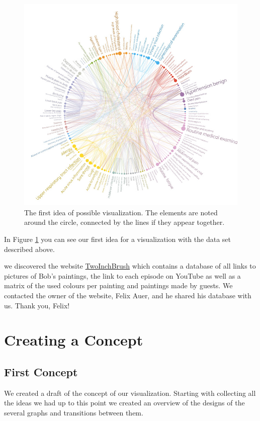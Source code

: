 \documentclass[a4paper]{tufte-book}
\begin{document}
\begin{figure}
	\includegraphics{Images/visualization_first_idea.jpg}
	\caption{The first idea of possible visualization. The elements are noted around the circle, connected by the lines if they appear together.}
	\label{fig:firstidea}
\end{figure}

In Figure \ref{fig:firstidea}\cite{firstidea} you can see our first idea for a visualization with the data set described above.

 we discovered the website \href{http://www.twoinchbrush.com/}{TwoInchBrush} which contains a database of all links to pictures of Bob's paintings, the link to each episode on YouTube as well as a matrix of the used colours per painting and paintings made by guests. We contacted the owner of the website, Felix Auer, and he shared his database\cite{felixauer} with us. Thank you, Felix!\\


\chapter{Creating a Concept}
\section{First Concept}

We created a draft of the concept of our visualization. Starting with collecting all the ideas we had up to this point we created an overview of the designs of the several graphs and transitions between them. 
\end{document}
